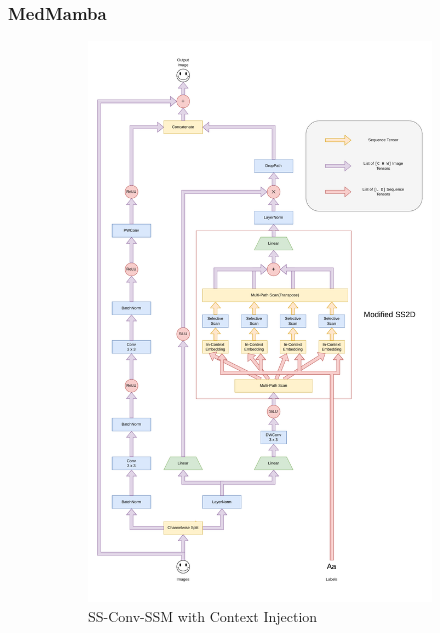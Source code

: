 \subsubsection{MedMamba}
\begin{figure}[ht]
    \begin{subfigure}{0.5\textwidth}
        \includegraphics[width=\textwidth]{figures/ss_conv_ssm.pdf}
        \caption{SS-Conv-SSM with Context Injection}
        \label{medmambastacklow}
    \end{subfigure}
    \begin{subfigure}{0.5\textwidth}

\end{subfigure}
\end{figure}
